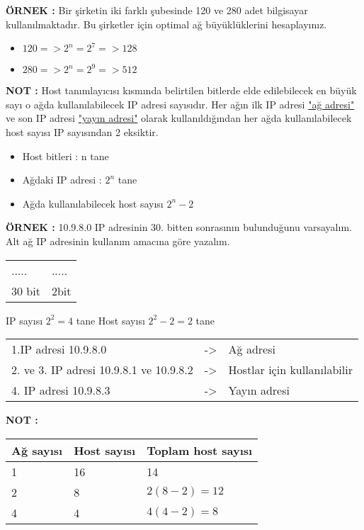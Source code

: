 \textbf{ÖRNEK : }Bir şirketin iki farklı şubesinde 120 ve 280 adet bilgisayar kullanılmaktadır. Bu şirketler için optimal ağ büyüklüklerini hesaplayınız. 

\begin{itemize}
\item[]$120 => 2^n = 2^7 => 128$
\item[]$280 => 2^n = 2^9 => 512$
\end{itemize}

\textbf{NOT : }Host tanımlayıcısı kısmında belirtilen bitlerde elde edilebilecek en büyük sayı o ağda kullanılabilecek IP adresi sayısıdır. Her ağın ilk IP adresi \underline{"ağ adresi"} ve son IP adresi \underline{"yayın adresi"} olarak kullanıldığından her ağda kullanılabilecek host sayısı IP sayısından 2 eksiktir.
\begin{itemize}
\item[] Host bitleri : n tane 
\item[] Ağdaki IP adresi : $2^n$ tane 
\item[] Ağda kullanılabilecek host sayısı $2^n-2$
\end{itemize}

\textbf{ÖRNEK : } 10.9.8.0 IP adresinin 30. bitten sonrasının bulunduğunu varsayalım. Alt ağ IP adresinin kullanım amacına göre yazalım. 

\begin{tabular}{ll}
..... & ..... \\
30 bit& 2bit\\
\end{tabular}

IP sayısı $2^2=4$ tane
Host sayısı $2^2-2=2$ tane


\begin{tabular}{lll}
1.IP adresi 10.9.8.0 & ->& Ağ adresi \\
2. ve 3. IP adresi 10.9.8.1 ve 10.9.8.2 & -> & Hostlar için kullanılabilir \\
4. IP adresi 10.9.8.3 & -> & Yayın adresi 
\end{tabular}

\textbf{NOT : }

\begin{tabular}{ll|l}
Ağ sayısı & Host sayısı &Toplam host sayısı\\
\hline 
1&16&14 \\
2 & 8 & $2(8-2) =12$ \\
4&4&$4(4-2) = 8$ \\
\end{tabular}


